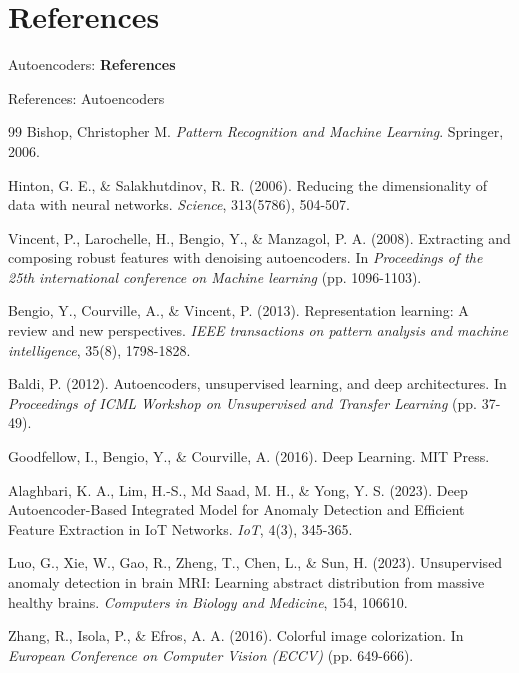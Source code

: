 \section{References}
\begin{frame}[allowframebreaks]{}
    \LARGE Autoencoders: \textbf{References}
\end{frame}

\begin{frame}[allowframebreaks]{References: Autoencoders}
\begin{thebibliography}{99}
Bishop, Christopher M. \emph{Pattern Recognition and Machine Learning}. Springer, 2006.

Hinton, G. E., \& Salakhutdinov, R. R. (2006).
Reducing the dimensionality of data with neural networks.
\textit{Science}, 313(5786), 504-507.

Vincent, P., Larochelle, H., Bengio, Y., \& Manzagol, P. A. (2008).
Extracting and composing robust features with denoising autoencoders.
In \textit{Proceedings of the 25th international conference on Machine learning} (pp. 1096-1103).

Bengio, Y., Courville, A., \& Vincent, P. (2013).
Representation learning: A review and new perspectives.
\textit{IEEE transactions on pattern analysis and machine intelligence}, 35(8), 1798-1828.

Baldi, P. (2012).
Autoencoders, unsupervised learning, and deep architectures.
In \textit{Proceedings of ICML Workshop on Unsupervised and Transfer Learning} (pp. 37-49).

Goodfellow, I., Bengio, Y., \& Courville, A. (2016).
Deep Learning.
MIT Press.

Alaghbari, K. A., Lim, H.-S., Md Saad, M. H., \& Yong, Y. S. (2023).
Deep Autoencoder-Based Integrated Model for Anomaly Detection and Efficient Feature Extraction in IoT Networks.
\textit{IoT}, 4(3), 345-365.

Luo, G., Xie, W., Gao, R., Zheng, T., Chen, L., \& Sun, H. (2023).
Unsupervised anomaly detection in brain MRI: Learning abstract distribution from massive healthy brains.
\textit{Computers in Biology and Medicine}, 154, 106610.

Zhang, R., Isola, P., \& Efros, A. A. (2016).
Colorful image colorization.
In \textit{European Conference on Computer Vision (ECCV)} (pp. 649-666).
\end{thebibliography}
\end{frame}



